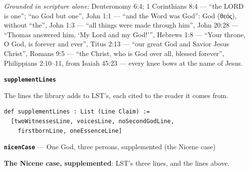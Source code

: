 \documentclass[11pt,paper=\testimonypaper,DIV=13,parskip=false]{scrartcl}
\begin{document}
\emph{Grounded in scripture alone:} Deuteronomy 6:4; 1 Corinthians 8:4 — “the LORD is one”; “no God but one”, John 1:1 — “and the Word was God”: God (θεός), without “the”, John 1:3 — “all things were made through him”, John 20:28 — “Thomas answered him, ‘My Lord and my God!’”, Hebrews 1:8 — “Your throne, O God, is forever and ever”, Titus 2:13 — “our great God and Savior Jesus Christ”, Romans 9:5 — “the Christ, who is God over all, blessed forever”, Philippians 2:10–11, from Isaiah 45:23 — every knee bows at the name of Jesus.
\par\medskip\noindent\textbf{\texttt{supplement\allowbreak{}Lines}}\par\nobreak\noindent
The lines the library adds to LST’s, each cited to the reader it comes from.

{\small\begin{verbatim}
def supplementLines : List (Line Claim) :=
  [twoWitnessesLine, voicesLine, noSecondGodLine,
    firstbornLine, oneEssenceLine]
\end{verbatim}}
\par\medskip\noindent\textbf{\texttt{nicen\allowbreak{}Case}} --- One God, three persons, supplemented (the Nicene case)\par\nobreak\noindent
\textbf{The Nicene case, supplemented}: LST’s three lines, and the lines above.
\end{document}
